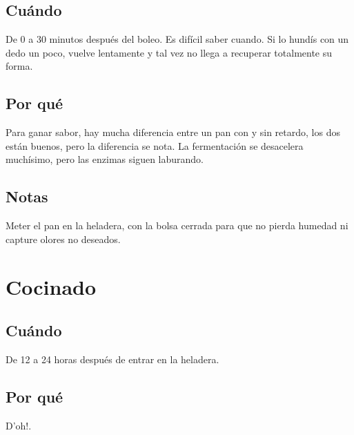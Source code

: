 \documentclass[10pt,a4paper]{article}
\begin{document}
\subsection*{Cuándo}
De 0 a 30 minutos después del boleo. Es difícil saber cuando. Si lo hundís con
un dedo un poco, vuelve lentamente y tal vez no llega a recuperar totalmente su forma.
\subsection*{Por qué}
Para ganar sabor, hay mucha diferencia entre un pan con y sin
retardo, los dos están buenos, pero la diferencia se nota. La fermentación se
desacelera muchísimo, pero las enzimas siguen laburando.

\subsection*{Notas}
Meter el pan en la heladera, con la bolsa cerrada para que no pierda humedad ni
capture olores no deseados.

\section{Cocinado}
\subsection*{Cuándo}
De 12 a 24 horas después de entrar en la heladera.
\subsection*{Por qué}
D'oh!.
\end{document}
